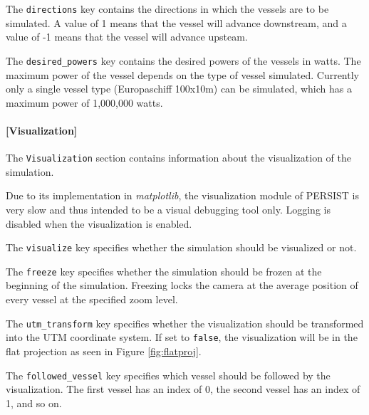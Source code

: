 \documentclass[
	a4paper, %
	12pt, %
]{persist}
\begin{document}
The \verb|directions| key contains the directions in which the vessels are to be simulated. A value of 1 means that the vessel will advance downstream, and a value of -1 means that the vessel will advance upsteam. 


The \verb|desired_powers| key contains the desired powers of the vessels in watts. The maximum power of the vessel depends on the type of vessel simulated. Currently only a single vessel type (Europaschiff 100x10m) can be simulated, which has a maximum power of 1,000,000 watts. 

\paragraph{[Visualization]}

The \verb|Visualization| section contains information about the visualization of the simulation. 

\begin{note}
	Due to its implementation in \emph{matplotlib}, the visualization module of PERSIST is very slow and thus intended to be a visual debugging tool only. Logging is  disabled when the visualization is enabled.
\end{note}

The \verb|visualize| key specifies whether the simulation should be visualized or not. 

The \verb|freeze| key specifies whether the simulation should be frozen at the beginning of the simulation. Freezing locks the camera at the average position of every vessel at the specified zoom level.

The \verb|utm_transform| key specifies whether the visualization should be transformed into the UTM coordinate system. If set to \verb|false|, the visualization will be in the flat projection as seen in Figure \ref{fig:flatproj}.

The \verb|followed_vessel| key specifies which vessel should be followed by the visualization. The first vessel has an index of 0, the second vessel has an index of 1, and so on. 
\end{document}
